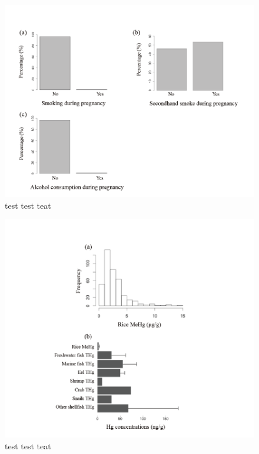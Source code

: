 \begin{figure}
  \centering
    \label{fig:Fig24}
  \includegraphics[scale=1]{Figures/Fig24.pdf}
  \caption[test caption]{test test teat}
\end{figure}

\begin{figure}
  \centering
    \label{fig:Fig25}
  \includegraphics[scale=1]{Figures/Fig25.pdf}
  \caption[test caption]{test test teat}
\end{figure}

